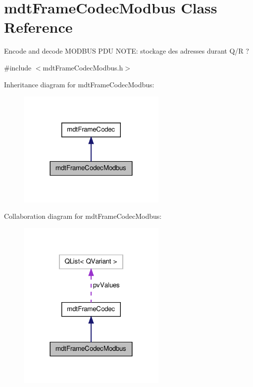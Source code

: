\hypertarget{classmdt_frame_codec_modbus}{\section{mdt\-Frame\-Codec\-Modbus Class Reference}
\label{classmdt_frame_codec_modbus}
}


Encode and decode M\-O\-D\-B\-U\-S P\-D\-U N\-O\-T\-E\-: stockage des adresses durant Q/\-R ?  




{\ttfamily \#include $<$mdt\-Frame\-Codec\-Modbus.\-h$>$}



Inheritance diagram for mdt\-Frame\-Codec\-Modbus\-:\nopagebreak
\begin{figure}[H]
\begin{center}
\leavevmode
\includegraphics[width=204pt]{classmdt_frame_codec_modbus__inherit__graph}
\end{center}
\end{figure}


Collaboration diagram for mdt\-Frame\-Codec\-Modbus\-:\nopagebreak
\begin{figure}[H]
\begin{center}
\leavevmode
\includegraphics[width=204pt]{classmdt_frame_codec_modbus__coll__graph}
\end{center}
\end{figure}
